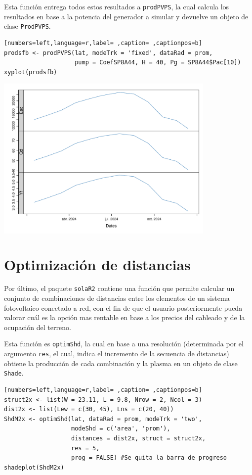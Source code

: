 \begin{itemize}
Esta función entrega todos estos resultados a \texttt{prodPVPS}, la cual calcula los resultados en base a la potencia del generador a simular y devuelve un objeto de clase \texttt{ProdPVPS}.
\begin{lstlisting}[numbers=left,language=r,label= ,caption= ,captionpos=b]
prodsfb <- prodPVPS(lat, modeTrk = 'fixed', dataRad = prom,
                    pump = CoefSP8A44, H = 40, Pg = SP8A44$Pac[10])
xyplot(prodsfb)
\end{lstlisting}

\begin{center}
\includegraphics[width=0.8\textwidth]{figuras/codigo-prodpvps.pdf}
\end{center}
\end{itemize}
\section{Optimización de distancias}
\label{sec:org5874512}
\label{optimizacion-distancias}
Por último, el paquete \texttt{solaR2} contiene una función que permite calcular un conjunto de combinaciones de distancias entre los elementos de un sistema fotovoltaico conectado a red, con el fin de que el usuario posteriormente pueda valorar cuál es la opción mas rentable en base a los precios del cableado y de la ocupación del terreno.

Esta función es \texttt{optimShd}, la cual en base a una resolución (determinada por el argumento \texttt{res}, el cual, indica el incremento de la secuencia de distancias) obtiene la producción de cada combinación y la plasma en un objeto de clase \texttt{Shade}.
\begin{lstlisting}[numbers=left,language=r,label= ,caption= ,captionpos=b]
struct2x <- list(W = 23.11, L = 9.8, Nrow = 2, Ncol = 3)
dist2x <- list(Lew = c(30, 45), Lns = c(20, 40))
ShdM2x <- optimShd(lat, dataRad = prom, modeTrk = 'two',
                   modeShd = c('area', 'prom'),
                   distances = dist2x, struct = struct2x,
                   res = 5,
                   prog = FALSE) #Se quita la barra de progreso
shadeplot(ShdM2x)
\end{lstlisting}

